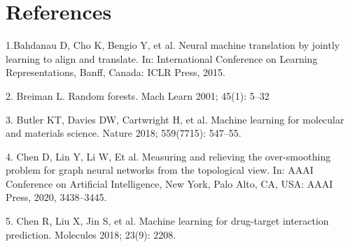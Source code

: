 \documentclass[12pt]{osa-supplemental-document}
\begin{document}
\section*{References} 

 1.Bahdanau D, Cho K, Bengio Y, et al. Neural machine translation by jointly learning to align and translate. In: International
Conference on Learning Representations, Banff, Canada: ICLR
Press, 2015.

2. Breiman L. Random forests. Mach Learn 2001; 45(1): 5–32

3. Butler KT, Davies DW, Cartwright H, et al. Machine learning
for molecular and materials science. Nature 2018; 559(7715):
547–55.

4. Chen D, Lin Y, Li W, Et al. Measuring and relieving the
over-smoothing problem for graph neural networks from the
topological view. In: AAAI Conference on Artificial Intelligence,
New York, Palo Alto, CA, USA: AAAI Press, 2020, 3438–3445.

5. Chen R, Liu X, Jin S, et al. Machine learning for drug-target
interaction prediction. Molecules 2018; 23(9): 2208.
\end{document}
